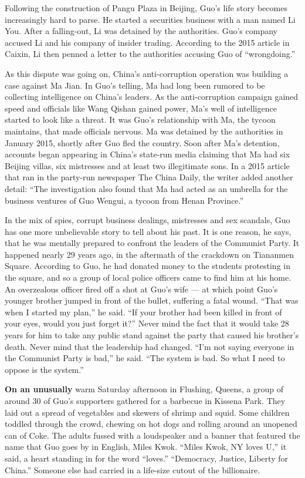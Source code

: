 Following the construction of Pangu Plaza in Beijing, Guo's life story
becomes increasingly hard to parse. He started a securities business
with a man named Li You. After a falling-out, Li was detained by the
authorities. Guo's company accused Li and his company of insider
trading. According to the 2015 article in Caixin, Li then penned a
letter to the authorities accusing Guo of ``wrongdoing.''

As this dispute was going on, China's anti-​corruption operation was
building a case against Ma Jian. In Guo's telling, Ma had long been
rumored to be collecting intelligence on China's leaders. As the
anti-corruption campaign gained speed and officials like Wang Qishan
gained power, Ma's well of intelligence started to look like a threat.
It was Guo's relationship with Ma, the tycoon maintains, that made
officials nervous. Ma was detained by the authorities in January 2015,
shortly after Guo fled the country. Soon after Ma's detention, accounts
began appearing in China's state-run media claiming that Ma had six
Beijing villas, six mistresses and at least two illegitimate sons. In a
2015 article that ran in the party-run newspaper The China Daily, the
writer added another detail: ``The investigation also found that Ma had
acted as an umbrella for the business ventures of Guo Wengui, a tycoon
from Henan Province.''

In the mix of spies, corrupt business dealings, mistresses and sex
scandals, Guo has one more unbelievable story to tell about his past. It
is one reason, he says, that he was mentally prepared to confront the
leaders of the Communist Party. It happened nearly 29 years ago, in the
aftermath of the crackdown on Tiananmen Square. According to Guo, he had
donated money to the students protesting in the square, and so a group
of local police officers came to find him at his home. An overzealous
officer fired off a shot at Guo's wife --- at which point Guo's younger
brother jumped in front of the bullet, suffering a fatal wound. ``That
was when I started my plan,'' he said. ``If your brother had been killed
in front of your eyes, would you just forget it?'' Never mind the fact
that it would take 28 years for him to take any public stand against the
party that caused his brother's death. Never mind that the leadership
had changed. ``I'm not saying everyone in the Communist Party is bad,''
he said. ``The system is bad. So what I need to oppose is the system.''

\textbf{On an unusually} warm Saturday afternoon in Flushing, Queens, a
group of around 30 of Guo's supporters gathered for a barbecue in
Kissena Park. They laid out a spread of vegetables and skewers of shrimp
and squid. Some children toddled through the crowd, chewing on hot dogs
and rolling around an unopened can of Coke. The adults fussed with a
loudspeaker and a banner that featured the name that Guo goes by in
English, Miles Kwok. ``Miles Kwok, NY loves U,'' it said, a heart
standing in for the word ``loves.'' ``Democracy, Justice, Liberty for
China.'' Someone else had carried in a life-size cutout of the
billionaire.

